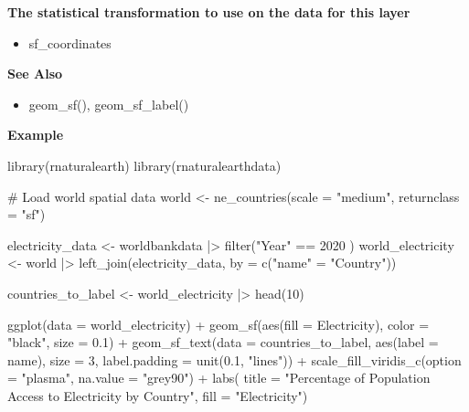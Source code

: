 \documentclass[
  letterpaper,
  DIV=11,
  numbers=noendperiod]{scrreprt}
\newenvironment{Shaded}{\begin{snugshade}}{\end{snugshade}}
\newcommand{\AttributeTok}[1]{\textcolor[rgb]{0.40,0.45,0.13}{#1}}
\newcommand{\CommentTok}[1]{\textcolor[rgb]{0.37,0.37,0.37}{#1}}
\newcommand{\DecValTok}[1]{\textcolor[rgb]{0.68,0.00,0.00}{#1}}
\newcommand{\FloatTok}[1]{\textcolor[rgb]{0.68,0.00,0.00}{#1}}
\newcommand{\FunctionTok}[1]{\textcolor[rgb]{0.28,0.35,0.67}{#1}}
\newcommand{\NormalTok}[1]{\textcolor[rgb]{0.00,0.23,0.31}{#1}}
\newcommand{\OtherTok}[1]{\textcolor[rgb]{0.00,0.23,0.31}{#1}}
\newcommand{\SpecialCharTok}[1]{\textcolor[rgb]{0.37,0.37,0.37}{#1}}
\newcommand{\StringTok}[1]{\textcolor[rgb]{0.13,0.47,0.30}{#1}}
\providecommand{\tightlist}{%
  \setlength{\itemsep}{0pt}\setlength{\parskip}{0pt}}\usepackage{longtable,booktabs,array}
\begin{document}
\textbf{The statistical transformation to use on the data for this
layer}

\begin{itemize}
\tightlist
\item
  sf\_coordinates
\end{itemize}

\textbf{See Also}

\begin{itemize}
\tightlist
\item
  geom\_sf(), geom\_sf\_label()
\end{itemize}

\textbf{Example}

\begin{Shaded}
\begin{Highlighting}[]
\FunctionTok{library}\NormalTok{(rnaturalearth)}
\FunctionTok{library}\NormalTok{(rnaturalearthdata)}

\CommentTok{\# Load world spatial data}
\NormalTok{world }\OtherTok{\textless{}{-}} \FunctionTok{ne\_countries}\NormalTok{(}\AttributeTok{scale =} \StringTok{"medium"}\NormalTok{, }\AttributeTok{returnclass =} \StringTok{"sf"}\NormalTok{)}

\NormalTok{electricity\_data }\OtherTok{\textless{}{-}}\NormalTok{ worldbankdata }\SpecialCharTok{|\textgreater{}} \FunctionTok{filter}\NormalTok{(}\StringTok{"Year"} \SpecialCharTok{==} \DecValTok{2020}\NormalTok{ )}
\NormalTok{world\_electricity }\OtherTok{\textless{}{-}}\NormalTok{ world }\SpecialCharTok{|\textgreater{}} 
  \FunctionTok{left\_join}\NormalTok{(electricity\_data, }\AttributeTok{by =} \FunctionTok{c}\NormalTok{(}\StringTok{"name"} \OtherTok{=} \StringTok{"Country"}\NormalTok{))}

\NormalTok{countries\_to\_label }\OtherTok{\textless{}{-}}\NormalTok{ world\_electricity }\SpecialCharTok{|\textgreater{}} \FunctionTok{head}\NormalTok{(}\DecValTok{10}\NormalTok{)}

\FunctionTok{ggplot}\NormalTok{(}\AttributeTok{data =}\NormalTok{ world\_electricity) }\SpecialCharTok{+}
  \FunctionTok{geom\_sf}\NormalTok{(}\FunctionTok{aes}\NormalTok{(}\AttributeTok{fill =}\NormalTok{ Electricity), }\AttributeTok{color =} \StringTok{"black"}\NormalTok{, }\AttributeTok{size =} \FloatTok{0.1}\NormalTok{) }\SpecialCharTok{+}
   \FunctionTok{geom\_sf\_text}\NormalTok{(}\AttributeTok{data =}\NormalTok{ countries\_to\_label, }\FunctionTok{aes}\NormalTok{(}\AttributeTok{label =}\NormalTok{ name), }\AttributeTok{size =} \DecValTok{3}\NormalTok{, }\AttributeTok{label.padding =} \FunctionTok{unit}\NormalTok{(}\FloatTok{0.1}\NormalTok{, }\StringTok{"lines"}\NormalTok{)) }\SpecialCharTok{+}
  \FunctionTok{scale\_fill\_viridis\_c}\NormalTok{(}\AttributeTok{option =} \StringTok{"plasma"}\NormalTok{, }\AttributeTok{na.value =} \StringTok{"grey90"}\NormalTok{) }\SpecialCharTok{+}
  \FunctionTok{labs}\NormalTok{(}
    \AttributeTok{title =} \StringTok{"Percentage of Population Access to Electricity by Country"}\NormalTok{,}
    \AttributeTok{fill =} \StringTok{"Electricity"}\NormalTok{)}
\end{Highlighting}
\end{Shaded}
\end{document}
